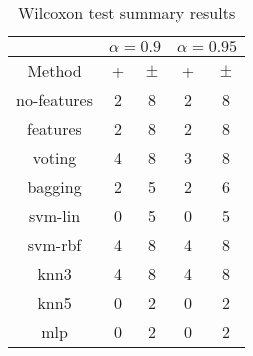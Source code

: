 \documentclass[a4paper,10pt]{article}
\begin{document}
\begin{sidewaystable}[!htp]
\centering\scriptsize
{}
\caption{Summary of the Wilcoxon test. \textbullet = the method in the row improves the method of the column. \textopenbullet = the method in the column improves the method of the row. Upper diagonal of level significance $\alpha=0.9$,Lower diagonal level of significance $\alpha=0.95$}

\end{sidewaystable}

 \clearpage 


\begin{table}[!htp]
\centering\scriptsize
\begin{tabular}{
|c|c|c|c|c|}
\hline
&\multicolumn{2}{c|}{$\alpha=0.9$} & \multicolumn{2}{c|}{$\alpha=0.95$}\\\hline
Method & + & $\pm$ & + & $\pm$ \\
\hline
no-features & 2 & 8 & 2 & 8\\
\hline
features & 2 & 8 & 2 & 8\\
\hline
voting & 4 & 8 & 3 & 8\\
\hline
bagging & 2 & 5 & 2 & 6\\
\hline
svm-lin & 0 & 5 & 0 & 5\\
\hline
svm-rbf & 4 & 8 & 4 & 8\\
\hline
knn3 & 4 & 8 & 4 & 8\\
\hline
knn5 & 0 & 2 & 0 & 2\\
\hline
mlp & 0 & 2 & 0 & 2\\
\hline

\end{tabular}
\caption{Wilcoxon test summary results}

\end{table}

 \clearpage 
\end{document}
